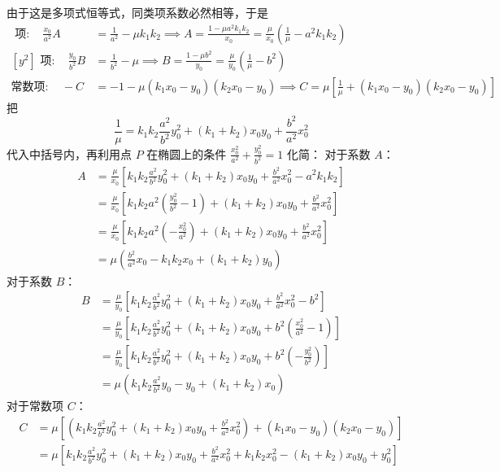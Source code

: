 \begin{solution}
由于这是多项式恒等式，同类项系数必然相等，于是
\begin{align*}
    [x^2] \text{ 项}: \quad \frac{x_0}{a^2}A &= \frac{1}{a^2} - \mu k_1k_2 \implies A = \frac{1 - \mu a^2 k_1k_2}{x_0} = \frac{\mu}{x_0}\left(\frac{1}{\mu} - a^2 k_1k_2\right)\\
    [y^2] \text{ 项}: \quad \frac{y_0}{b^2}B &= \frac{1}{b^2} - \mu \implies B = \frac{1 - \mu b^2}{y_0} = \frac{\mu}{y_0}\left(\frac{1}{\mu} - b^2\right)\\
    \text{常数项}: \quad -C &= - 1 - \mu(k_1x_0 - y_0)(k_2x_0 - y_0) \implies C = \mu\left[ \frac{1}{\mu} + (k_1x_0 - y_0)(k_2x_0 - y_0) \right]
\end{align*}
把
\[
\frac{1}{\mu} = k_1k_2\frac{a^2}{b^2}y_0^2 + (k_1+k_2)x_0y_0 + \frac{b^2}{a^2}x_0^2
\]
代入中括号内，再利用点 $P$ 在椭圆上的条件 $\frac{x_0^2}{a^2} + \frac{y_0^2}{b^2} = 1$ 化简：
对于系数 $A$：
\begin{align*}
    A &= \frac{\mu}{x_0} \left[ k_1k_2\frac{a^2}{b^2}y_0^2 + (k_1+k_2)x_0y_0 + \frac{b^2}{a^2}x_0^2 - a^2 k_1k_2 \right] \\
    &= \frac{\mu}{x_0} \left[ k_1k_2 a^2 \left(\frac{y_0^2}{b^2} - 1\right) + (k_1+k_2)x_0y_0 + \frac{b^2}{a^2}x_0^2 \right] \\
    &= \frac{\mu}{x_0} \left[ k_1k_2 a^2 \left(-\frac{x_0^2}{a^2}\right) + (k_1+k_2)x_0y_0 + \frac{b^2}{a^2}x_0^2 \right] \\
    &= \mu \left( \frac{b^2}{a^2}x_0 - k_1k_2 x_0 + (k_1+k_2)y_0 \right)
\end{align*}
对于系数 $B$：
\begin{align*}
    B &= \frac{\mu}{y_0} \left[ k_1k_2\frac{a^2}{b^2}y_0^2 + (k_1+k_2)x_0y_0 + \frac{b^2}{a^2}x_0^2 - b^2 \right] \\
    &= \frac{\mu}{y_0} \left[ k_1k_2\frac{a^2}{b^2}y_0^2 + (k_1+k_2)x_0y_0 + b^2 \left(\frac{x_0^2}{a^2} - 1\right) \right] \\
    &= \frac{\mu}{y_0} \left[ k_1k_2\frac{a^2}{b^2}y_0^2 + (k_1+k_2)x_0y_0 + b^2 \left(-\frac{y_0^2}{b^2}\right) \right] \\
    &= \mu \left( k_1k_2\frac{a^2}{b^2}y_0 - y_0 + (k_1+k_2)x_0 \right)
\end{align*}
对于常数项 $C$：
\begin{align*}
    C &= \mu \left[ \left( k_1k_2\frac{a^2}{b^2}y_0^2 + (k_1+k_2)x_0y_0 + \frac{b^2}{a^2}x_0^2 \right) + (k_1x_0 - y_0)(k_2x_0 - y_0) \right] \\
    &= \mu \left[ k_1k_2\frac{a^2}{b^2}y_0^2 + (k_1+k_2)x_0y_0 + \frac{b^2}{a^2}x_0^2 + k_1k_2x_0^2 - (k_1+k_2)x_0y_0 + y_0^2 \right] \\

\end{align*}
\end{solution}
